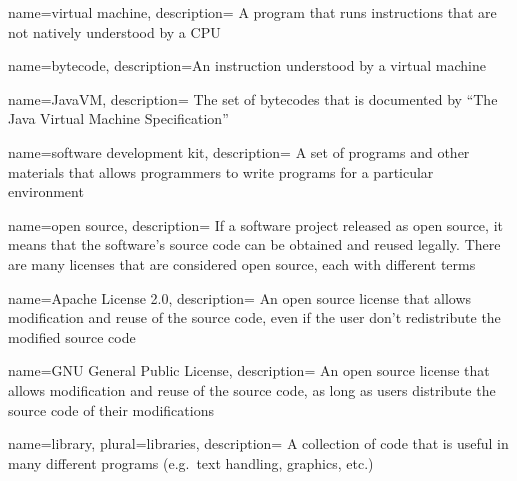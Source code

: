 {
    name={virtual machine},
    description=
    {
        A program that runs instructions that are not natively understood by a
        CPU
    }
}

{
    name=bytecode,
    description={An instruction understood by a virtual machine}
}

{
    name=JavaVM,
    description=
    {
        The set of bytecodes that is documented by ``The Java Virtual
        Machine Specification'' \cite{javavm-bytecode}
    }
}

{
    name={software development kit},
    description=
    {
        A set of programs and other materials that allows programmers to write
        programs for a particular environment
    }
}

{
    name={open source},
    description=
    {
        If a software project released as open source, it means that the
        software's source code can be obtained and reused legally.  There are
        many licenses that are considered open source, each with different
        terms
    }
}

{
    name={Apache License 2.0},
    description=
    {
        An open source license that allows modification and reuse of the source
        code, even if the user don't redistribute the modified source code
        \cite{apache-license}
    }
}

{
    name={GNU General Public License},
    description=
    {
        An open source license that allows modification and reuse of the source
        code, as long as users distribute the source code of their
        modifications \cite{gpl-license}
    }
}

{
    name=library,
    plural=libraries,
    description=
    {
        A collection of code that is useful in many different programs (e.g.\
        text handling, graphics, etc.)
    }
}
